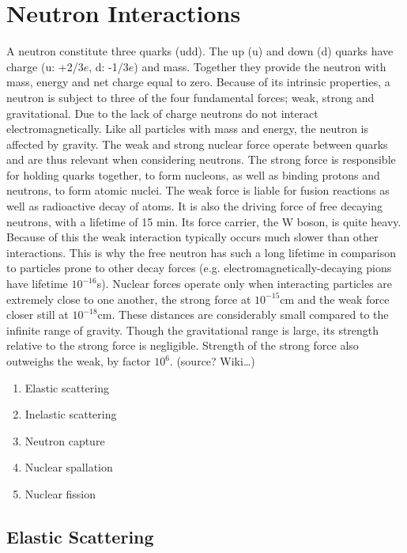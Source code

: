 \section{Neutron Interactions}

A neutron constitute three quarks (udd). The up (u) and down (d) quarks have charge (u: +2/3$e$, d: -1/3$e$) and mass. Together they provide the neutron with mass, energy and net charge equal to zero. Because of its intrinsic properties, a neutron is subject to three of the four fundamental forces; weak, strong and gravitational. Due to the lack of charge neutrons do not interact electromagnetically.
Like all particles with mass and energy, the neutron is affected by gravity. The weak and strong nuclear force operate between quarks and are thus relevant when considering neutrons. The strong force is responsible for holding quarks together, to form nucleons, as well as binding protons and neutrons, to form atomic nuclei. The weak force is liable for fusion reactions as well as radioactive decay of atoms. It is also the driving force of free decaying neutrons, with a lifetime of 15 min. Its force carrier, the W boson, is quite heavy. Because of this the weak interaction typically occurs much slower than other interactions. This is why the free neutron has such a long lifetime in comparison to particles prone to other decay forces (e.g. electromagnetically-decaying pions have lifetime $10^{-16}$s).
Nuclear forces operate only when interacting particles are extremely close to one another, the strong force at $10^{-15}$cm and the weak force closer still at $10^{-18}$cm. These distances are considerably small compared to the infinite range of gravity. Though the gravitational range is large, its strength relative to the strong force is negligible. Strength of the strong force also outweighs the weak, by factor $10^6$. (source? Wiki…)
    \begin{enumerate}[noitemsep]
      \item Elastic scattering
      \item Inelastic scattering
      \item Neutron capture
      \item Nuclear spallation
      \item Nuclear fission
    \end{enumerate}

\subsection{Elastic Scattering}

